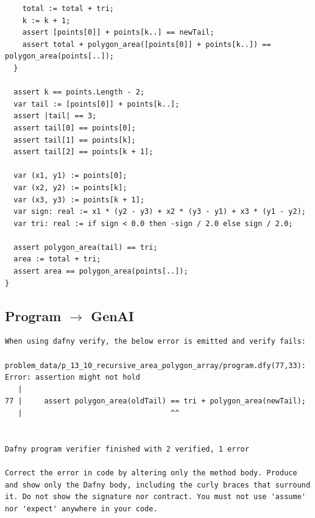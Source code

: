\documentclass{article}
\begin{document}
\begin{lstlisting}
    total := total + tri;
    k := k + 1;
    assert [points[0]] + points[k..] == newTail;
    assert total + polygon_area([points[0]] + points[k..]) == polygon_area(points[..]);
  }

  assert k == points.Length - 2;
  var tail := [points[0]] + points[k..];
  assert |tail| == 3;
  assert tail[0] == points[0];
  assert tail[1] == points[k];
  assert tail[2] == points[k + 1];

  var (x1, y1) := points[0];
  var (x2, y2) := points[k];
  var (x3, y3) := points[k + 1];
  var sign: real := x1 * (y2 - y3) + x2 * (y3 - y1) + x3 * (y1 - y2);
  var tri: real := if sign < 0.0 then -sign / 2.0 else sign / 2.0;

  assert polygon_area(tail) == tri;
  area := total + tri;
  assert area == polygon_area(points[..]);
}
\end{lstlisting}
\subsection*{Program $\rightarrow$ GenAI}
\begin{lstlisting}
When using dafny verify, the below error is emitted and verify fails:

problem_data/p_13_10_recursive_area_polygon_array/program.dfy(77,33): Error: assertion might not hold
   |
77 |     assert polygon_area(oldTail) == tri + polygon_area(newTail);
   |                                  ^^


Dafny program verifier finished with 2 verified, 1 error

Correct the error in code by altering only the method body. Produce and show only the Dafny body, including the curly braces that surround it. Do not show the signature nor contract. You must not use 'assume' nor 'expect' anywhere in your code.
\end{lstlisting}
\end{document}
